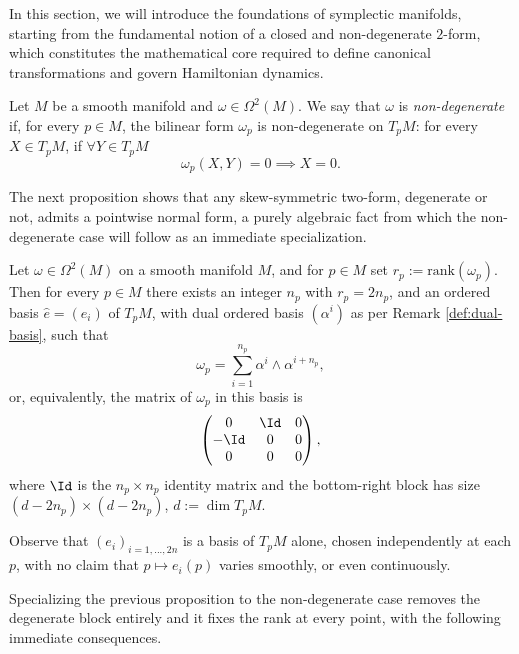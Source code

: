 In this section, we will introduce the foundations of symplectic manifolds, starting from the fundamental notion of a closed and non-degenerate $2$-form, which constitutes the mathematical core required to define canonical transformations and govern Hamiltonian dynamics.

\begin{definition}\label{def:non-deg}
	Let $M$ be a smooth manifold and $\omega \in \Omega^2(M)$. We say that $\omega$ is \emph{non-degenerate} if, for every $p \in M$, the bilinear form $\omega_p$ is non-degenerate on $T_pM$: for every $X \in T_pM$, if $\forall Y \in T_pM$ 
	\[
		\omega_p(X,Y) = 0 \implies X = 0.
	\]
\end{definition}

The next proposition shows that any skew-symmetric two-form, degenerate or not, admits a pointwise normal form, a purely algebraic fact from which the non-degenerate case will follow as an immediate specialization.

\begin{proposition}\label{prop:skew-normal-form-manifold}
	Let $\omega \in \Omega^2(M)$ on a smooth manifold $M$, and for $p \in M$ set $r_p := \mathrm{rank}(\omega_p)$. Then for every $p \in M$ there exists an integer $n_p$ with $r_p = 2n_p$, and an ordered basis $\hat e = (e_i)$ of $T_pM$, with dual ordered basis $(\alpha^i)$ as per Remark \ref{def:dual-basis}, such that
	\[
	\omega_p = \sum_{i=1}^{n_p} \alpha^i \wedge \alpha^{i+n_p},
	\]
	or, equivalently, the matrix of $\omega_p$ in this basis is
	\[
	\begin{pmatrix}
		0 & \Id & 0 \\
		-\Id & 0 & 0 \\
		0 & 0 & 0
	\end{pmatrix},
	\]
	where $\Id$ is the $n_p \times n_p$ identity matrix and the bottom-right block has size $(d-2n_p)\times(d-2n_p)$, $d := \dim T_pM$.
\end{proposition}

\begin{remark}
	Observe that $(e_i)_{i=1,...,2n}$ is a basis of $T_pM$ alone, chosen independently at each $p$, with no claim that $p \mapsto e_i(p)$ varies smoothly, or even continuously.
\end{remark}

\noindent Specializing the previous proposition to the non-degenerate case removes the degenerate block entirely and it fixes the rank at every point, with the following immediate consequences.

